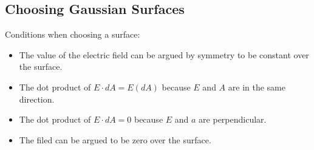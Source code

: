 \subsection{Choosing Gaussian Surfaces}
Conditions when choosing a surface:
\begin{itemize}
	\item The value of the electric field can be argued by symmetry to be constant over the surface.
	\item The dot product of $E\cdot dA=E(dA)$ because $E$ and $A$ are in the same direction.
	\item The dot product of $E\cdot dA = 0$ because $E$ and $a$ are perpendicular.
	\item The filed can be argued to be zero over the surface. 
\end{itemize}

